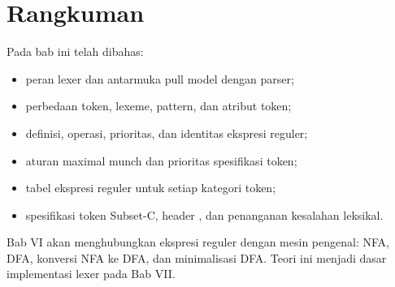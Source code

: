 \section*{Rangkuman}

Pada bab ini telah dibahas:
\begin{itemize}[leftmargin=*]
  \item peran lexer dan antarmuka pull model dengan parser;
  \item perbedaan token, lexeme, pattern, dan atribut token;
  \item definisi, operasi, prioritas, dan identitas ekspresi reguler;
  \item aturan maximal munch dan prioritas spesifikasi token;
  \item tabel ekspresi reguler untuk setiap kategori token;
  \item spesifikasi token Subset-C, header , dan
        penanganan kesalahan leksikal.
\end{itemize}

Bab VI akan menghubungkan ekspresi reguler dengan mesin pengenal:
NFA, DFA, konversi NFA ke DFA, dan minimalisasi DFA. Teori ini menjadi
dasar implementasi lexer pada Bab VII.
